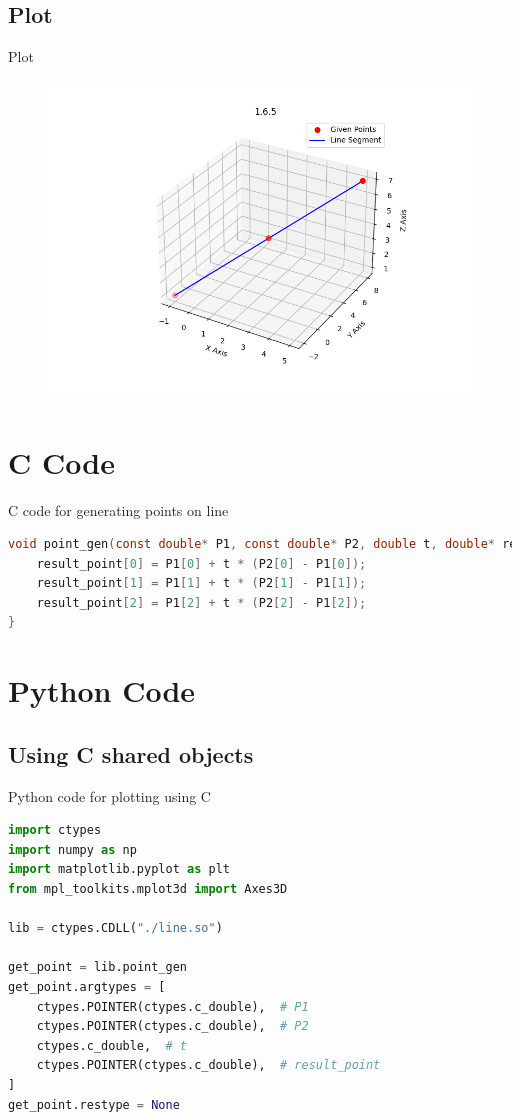 \documentclass{beamer}
\theoremstyle{remark}
\numberwithin{equation}{section}
\begin{document}
\subsection{Plot}
\begin{frame}{Plot}
 \begin{figure}[H]
    \centering
    \includegraphics[width=\columnwidth]{../figs/plot.png}
    \caption*{}
    \label{fig:plot}
\end{figure}
\end{frame}

\section{C Code}
\begin{frame}[fragile]{C code for generating points on line}
\begin{lstlisting}[language=C]
void point_gen(const double* P1, const double* P2, double t, double* result_point) {
    result_point[0] = P1[0] + t * (P2[0] - P1[0]);
    result_point[1] = P1[1] + t * (P2[1] - P1[1]);
    result_point[2] = P1[2] + t * (P2[2] - P1[2]);
}
\end{lstlisting}
\end{frame}
\section{Python Code}
\subsection{Using C shared objects}
\begin{frame}[fragile]{Python code for plotting using C}
\begin{lstlisting}[language=Python]
import ctypes
import numpy as np
import matplotlib.pyplot as plt
from mpl_toolkits.mplot3d import Axes3D

lib = ctypes.CDLL("./line.so")

get_point = lib.point_gen
get_point.argtypes = [
    ctypes.POINTER(ctypes.c_double),  # P1
    ctypes.POINTER(ctypes.c_double),  # P2
    ctypes.c_double,  # t
    ctypes.POINTER(ctypes.c_double),  # result_point
]
get_point.restype = None
\end{lstlisting}
\end{frame}
\end{document}
